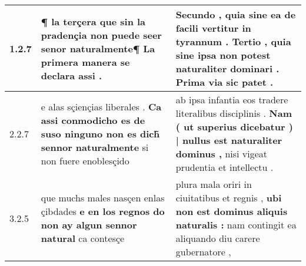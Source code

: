 \begin{tabular}{|p{1cm}|p{6.5cm}|p{6.5cm}|}

\hline
1.2.7 & ¶ la terçera \textbf{ que sin la pradençia non puede seer senor naturalmente¶ } La primera manera se declara assi . & Secundo , quia sine ea de facili vertitur in tyrannum . \textbf{ Tertio , quia sine ipsa non potest naturaliter dominari . } Prima via sic patet . \\\hline
2.2.7 & e alas sçiençias liberales . \textbf{ Ca assi conmodicho es de suso ninguno non es dich̃ sennor naturalmente } si non fuere enoblesçido & ab ipsa infantia eos tradere literalibus disciplinis . \textbf{ Nam ( ut superius dicebatur ) | nullus est naturaliter dominus , } nisi vigeat prudentia et intellectu . \\\hline
3.2.5 & que muchs males nasçen enlas çibdades \textbf{ e en los regnos do non ay algun sennor natural } ca contesçe & plura mala oriri in ciuitatibus et regnis , \textbf{ ubi non est dominus aliquis naturalis : } nam contingit ea aliquando diu carere gubernatore , \\\hline

\end{tabular}
